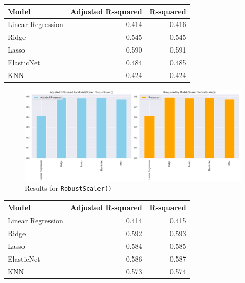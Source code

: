 \documentclass{article}
\theoremstyle{mytheoremstyle}
\theoremstyle{mytheoremstyle}
\theoremstyle{myproblemstyle}
\begin{document}
\begin{table}[ht]
\centering
\begin{tabular}{@{}lrr@{}}
\toprule
Model            & \multicolumn{1}{c}{Adjusted R-squared} & \multicolumn{1}{c}{R-squared} \\ 
\midrule
Linear Regression & 0.414 & 0.416 \\
Ridge             & 0.545 & 0.545 \\
Lasso             & 0.590 & 0.591 \\
ElasticNet        & 0.484 & 0.485 \\
KNN               & 0.424 & 0.424 \\
\bottomrule
\end{tabular}
\label{tab:model_performance standard}
\end{table}

\FloatBarrier %
\pagebreak

\begin{figure}[htbp]
\centering
\includegraphics[width=\linewidth]{Images/evalRegModelRobustScaler.png}
\caption{Results for \texttt{RobustScaler()}}
\label{fig:Robust Scaler Results}
\end{figure}


\begin{table}[ht]
\centering
\begin{tabular}{@{}lrr@{}}
\toprule
Model            & \multicolumn{1}{c}{Adjusted R-squared} & \multicolumn{1}{c}{R-squared} \\ 
\midrule
Linear Regression & 0.414 & 0.415 \\
Ridge             & 0.592 & 0.593 \\
Lasso             & 0.584 & 0.585 \\
ElasticNet        & 0.586 & 0.587 \\
KNN               & 0.573 & 0.574 \\
\bottomrule
\end{tabular}
\label{tab:model_performance robust}
\end{table}
\end{document}
